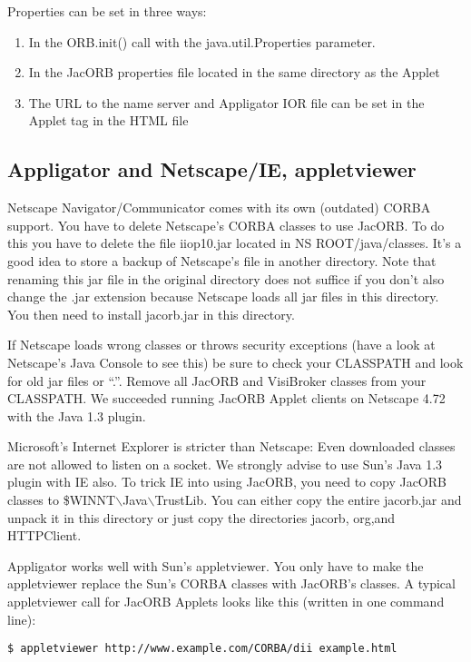 \documentclass[12pt]{scrbook}
\begin{document}
Properties can be set in three ways:
\begin{enumerate}
\item In the ORB.init() call with the java.util.Properties parameter.
\item In the JacORB properties file located in the same directory as
  the Applet
\item The URL to the name server and Appligator IOR file can be set in
  the Applet tag in the HTML file
\end{enumerate}


\subsection{Appligator and Netscape/IE, appletviewer}

Netscape Navigator/Communicator comes with its own (outdated) CORBA
support. You have to delete Netscape's CORBA classes to use JacORB. To
do this you have to delete the file iiop10.jar located in NS
ROOT/java/classes. It's a good idea to store a backup of Netscape's
file in another directory. Note that renaming this jar file in the
original directory does not suffice if you don't also change the .jar
extension because Netscape loads all jar files in this directory. You
then need to install jacorb.jar in this directory. 

If Netscape loads wrong classes or throws security exceptions (have a
look at Netscape's Java Console to see this) be sure to check your
CLASSPATH and look for old jar files or ``.''. Remove all JacORB and
VisiBroker classes from your CLASSPATH. We succeeded running JacORB
Applet clients on Netscape  4.72 with the Java 1.3 plugin.

Microsoft's Internet Explorer is stricter than Netscape: Even
downloaded classes are not allowed to listen on a socket. We strongly
advise to use Sun's Java 1.3 plugin with IE also. To trick IE into
using JacORB, you need to copy JacORB classes to
\$WINNT$\backslash$Java$\backslash$TrustLib. You can either copy the
entire jacorb.jar and unpack it in this directory or just copy the
directories jacorb, org,and HTTPClient.
 
Appligator works well with Sun's appletviewer. You only have to make
the appletviewer replace the Sun's CORBA classes with JacORB's
classes. A typical appletviewer call for JacORB Applets looks like
this (written in one command line): 

\verb+$ appletviewer http://www.example.com/CORBA/dii example.html+
\end{document}
